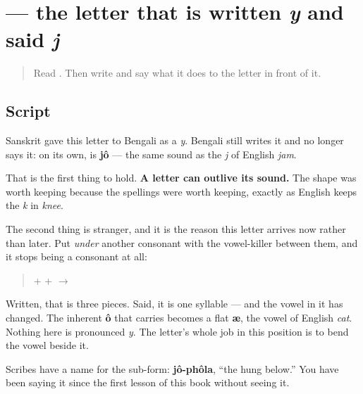\section[\texorpdfstring{\bn{য} (jô)}{য (jô)}]{ — the letter that is written \emph{y} and said \emph{j}}

\label{lesson:BN-W02-ya}



\begin{quote}
Read \textbf{}. Then write \textbf{} and say what it does to the letter in front of it.
\end{quote}

\subsection*{Script}

\begin{quote}
\end{quote}

Sanskrit gave this letter to Bengali as a \emph{y}. Bengali still writes it and no longer says it: on its own, \textbf{} is \textbf{jô} — the same sound as the \emph{j} of English \emph{jam}.

That is the first thing to hold. \textbf{A letter can outlive its sound.} The shape was worth keeping because the spellings were worth keeping, exactly as English keeps the \emph{k} in \emph{knee}.

The second thing is stranger, and it is the reason this letter arrives now rather than later. Put \textbf{} \emph{under} another consonant with the vowel-killer \textbf{} between them, and it stops being a consonant at all:

\begin{quote}
\textbf{} + \textbf{} + \textbf{} $\to$ \textbf{}
\end{quote}

Written, that is three pieces. Said, it is one syllable — and the vowel in it has changed. The inherent \textbf{ô} that \textbf{} carries becomes a flat \textbf{æ}, the vowel of English \emph{cat}. Nothing here is pronounced \emph{y}. The letter's whole job in this position is to bend the vowel beside it.

Scribes have a name for the sub-form: \textbf{jô-phôla}, \textquotedblleft{}the  hung below.\textquotedblright{} You have been saying it since the first lesson of this book without seeing it.

